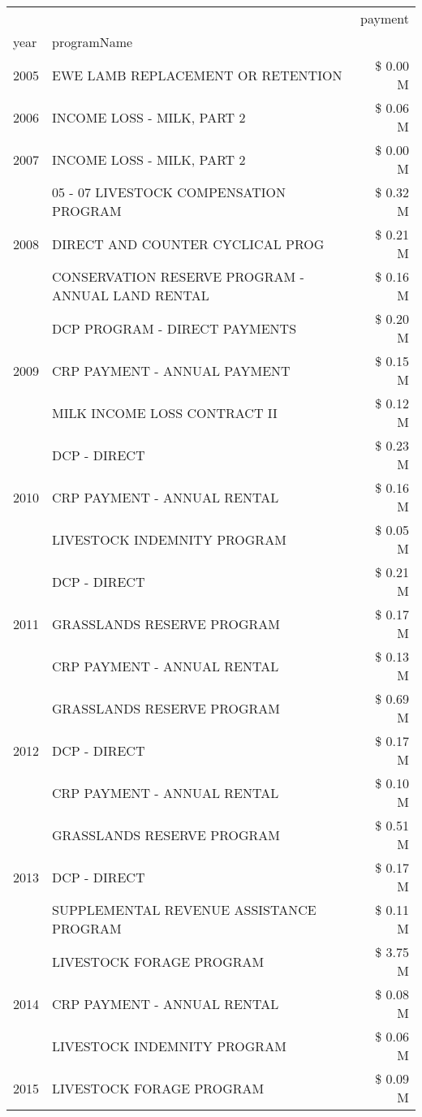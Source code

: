 \begin{tabular}{llr}
\toprule
 &  & payment \\
year & programName &  \\
\midrule
2005 & EWE LAMB REPLACEMENT OR RETENTION & \$ 0.00 M \\
\cline{1-3}
2006 & INCOME LOSS - MILK, PART 2 & \$ 0.06 M \\
\cline{1-3}
2007 & INCOME LOSS - MILK, PART 2 & \$ 0.00 M \\
\cline{1-3}
\multirow[t]{3}{*}{2008} & 05 - 07 LIVESTOCK COMPENSATION PROGRAM & \$ 0.32 M \\
 & DIRECT AND COUNTER CYCLICAL PROG & \$ 0.21 M \\
 & CONSERVATION RESERVE PROGRAM - ANNUAL LAND RENTAL & \$ 0.16 M \\
\cline{1-3}
\multirow[t]{3}{*}{2009} & DCP PROGRAM - DIRECT PAYMENTS & \$ 0.20 M \\
 & CRP PAYMENT - ANNUAL PAYMENT & \$ 0.15 M \\
 & MILK INCOME LOSS CONTRACT II & \$ 0.12 M \\
\cline{1-3}
\multirow[t]{3}{*}{2010} & DCP - DIRECT & \$ 0.23 M \\
 & CRP PAYMENT - ANNUAL RENTAL & \$ 0.16 M \\
 & LIVESTOCK INDEMNITY PROGRAM & \$ 0.05 M \\
\cline{1-3}
\multirow[t]{3}{*}{2011} & DCP - DIRECT & \$ 0.21 M \\
 & GRASSLANDS RESERVE PROGRAM & \$ 0.17 M \\
 & CRP PAYMENT - ANNUAL RENTAL & \$ 0.13 M \\
\cline{1-3}
\multirow[t]{3}{*}{2012} & GRASSLANDS RESERVE PROGRAM & \$ 0.69 M \\
 & DCP - DIRECT & \$ 0.17 M \\
 & CRP PAYMENT - ANNUAL RENTAL & \$ 0.10 M \\
\cline{1-3}
\multirow[t]{3}{*}{2013} & GRASSLANDS RESERVE PROGRAM & \$ 0.51 M \\
 & DCP - DIRECT & \$ 0.17 M \\
 & SUPPLEMENTAL REVENUE ASSISTANCE PROGRAM & \$ 0.11 M \\
\cline{1-3}
\multirow[t]{3}{*}{2014} & LIVESTOCK FORAGE PROGRAM & \$ 3.75 M \\
 & CRP PAYMENT - ANNUAL RENTAL & \$ 0.08 M \\
 & LIVESTOCK INDEMNITY PROGRAM & \$ 0.06 M \\
\cline{1-3}
\multirow[t]{3}{*}{2015} & LIVESTOCK FORAGE PROGRAM & \$ 0.09 M \\

\end{tabular}
